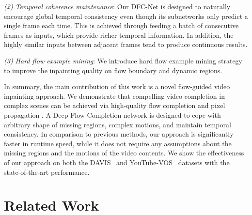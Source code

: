 \documentclass[10pt,twocolumn,letterpaper]{article}
\begin{document}
\noindent \textit{(2) Temporal coherence maintenance}:
Our DFC-Net is designed to naturally encourage global temporal consistency even though its subnetworks only predict a single frame each time.
This is achieved through feeding a batch of consecutive frames as inputs, which provide richer temporal information.
In addition, the highly similar inputs between adjacent frames tend to produce continuous results.





\noindent \textit{(3) Hard flow example mining}:
We introduce hard flow example mining strategy to improve the inpainting quality on flow boundary and dynamic regions.


In summary, the main contribution of this work is a novel flow-guided video inpainting approach. We demonstrate that compelling video completion in complex scenes can be achieved via high-quality flow completion and pixel propagation . A Deep Flow Completion network is designed to cope with arbitrary shape of missing regions, complex motions, and maintain temporal consistency. In comparison to previous methods, our approach is significantly faster in runtime speed, while it does not require any assumptions about the missing regions and the motions of the video contents. We show the effectiveness of our approach on both the DAVIS~\cite{Perazzi2016} and YouTube-VOS~\cite{xu2018youtube} datasets with the state-of-the-art performance.
 


 


\section{Related Work}
\label{sec:related_work}
\end{document}
